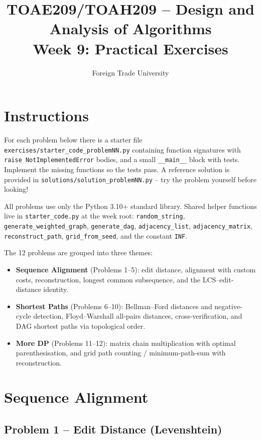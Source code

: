 \documentclass[11pt]{article}
\title{TOAE209/TOAH209 -- Design and Analysis of Algorithms\\[4pt]
\large Week 9: Practical Exercises}
\author{Foreign Trade University}
\date{}
\begin{document}
\maketitle

\section*{Instructions}

For each problem below there is a starter file
\texttt{exercises/starter\_code\_problemNN.py} containing function signatures with
\texttt{raise NotImplementedError} bodies, and a small \texttt{\_\_main\_\_} block with
tests. Implement the missing functions so the tests pass. A reference solution is
provided in \texttt{solutions/solution\_problemNN.py} -- try the problem yourself before
looking!

All problems use only the Python 3.10+ standard library. Shared helper functions live in
\texttt{starter\_code.py} at the week root: \texttt{random\_string},
\texttt{generate\_weighted\_graph}, \texttt{generate\_dag}, \texttt{adjacency\_list},
\texttt{adjacency\_matrix}, \texttt{reconstruct\_path}, \texttt{grid\_from\_seed}, and the
constant \texttt{INF}.

The 12 problems are grouped into three themes:
\begin{itemize}
    \item \textbf{Sequence Alignment} (Problems 1--5): edit distance, alignment with custom
    costs, reconstruction, longest common subsequence, and the LCS--edit-distance identity.
    \item \textbf{Shortest Paths} (Problems 6--10): Bellman--Ford distances and
    negative-cycle detection, Floyd--Warshall all-pairs distances, cross-verification, and
    DAG shortest paths via topological order.
    \item \textbf{More DP} (Problems 11--12): matrix chain multiplication with optimal
    parenthesisation, and grid path counting / minimum-path-sum with reconstruction.
\end{itemize}

\newpage
\section{Sequence Alignment}

\subsection*{Problem 1 -- Edit Distance (Levenshtein)}
\end{document}
